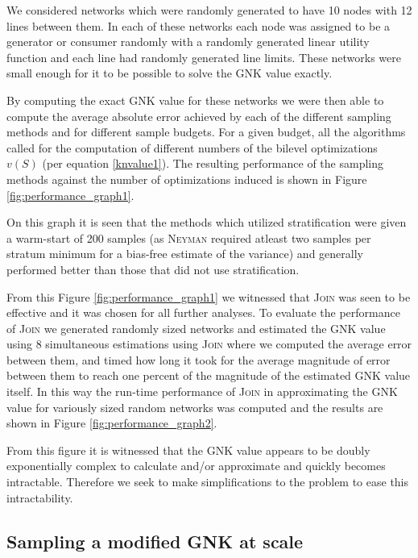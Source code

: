 We considered networks which were randomly generated to have 10 nodes with 12 lines between them.
In each of these networks each node was assigned to be a generator or consumer randomly with a randomly generated linear utility function and each line had randomly generated line limits.
These networks were small enough for it to be possible to solve the GNK value exactly.

By computing the exact GNK value for these networks we were then able to compute the average absolute error achieved by each of the different sampling methods and for different sample budgets.
For a given budget, all the algorithms called for the computation of different numbers of the bilevel optimizations $v(S)$ (per equation \eqref{knvalue1}).
The resulting performance of the sampling methods against the number of optimizations induced is shown in Figure \ref{fig:performance_graph1}.

On this graph it is seen that the methods which utilized stratification were given a warm-start of 200 samples (as \textsc{Neyman} required atleast two samples per stratum minimum for a bias-free estimate of the variance) and generally performed better than those that did not use stratification.

From this Figure \ref{fig:performance_graph1} we witnessed that \textsc{Join} was seen to be effective and it was chosen for all further analyses.
To evaluate the performance of \textsc{Join} we generated randomly sized networks and estimated the GNK value using 8 simultaneous estimations using \textsc{Join} where we computed the average error between them, and timed how long it took for the average magnitude of error between them to reach one percent of the magnitude of the estimated GNK value itself.
In this way the run-time performance of \textsc{Join} in approximating the GNK value for variously sized random networks was computed and the results are shown in Figure \ref{fig:performance_graph2}.

From this figure it is witnessed that the GNK value appears to be doubly exponentially complex to calculate and/or approximate and quickly becomes intractable.
Therefore we seek to make simplifications to the problem to ease this intractability.


\iffigures

\fi

\iffigures


\fi


\subsection{Sampling a modified GNK at scale}\label{sec:modified_gnk}

